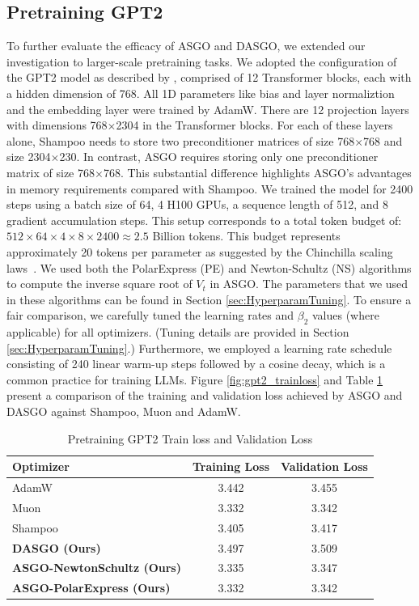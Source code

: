 \documentclass{article}
\theoremstyle{remark}
\begin{document}
\subsection{Pretraining GPT2}\label{sec:pretrainGPT2}
To further evaluate the efficacy of ASGO and DASGO, we extended our investigation to larger-scale pretraining tasks.
We adopted the configuration of the GPT2 model as described by \citep{Karpathy2022},
comprised of 12 Transformer blocks, each with a hidden dimension of 768. All 1D parameters like bias and layer normaliztion and  the embedding layer were trained by AdamW.
There are 12 projection layers with dimensions 768$\times$2304 in the Transformer blocks.
For each of these layers alone, Shampoo needs to store two preconditioner matrices of size 768$\times$768 and size 2304$\times$230.
In contrast, ASGO requires storing only one preconditioner matrix of size 768$\times$768.
This substantial difference highlights ASGO's advantages in memory requirements compared with Shampoo.
We trained the model for 2400 steps using a batch size of 64, 4 H100 GPUs, a sequence length of 512, and 8 gradient accumulation steps.
This setup corresponds to a total token budget of: $512 \times 64 \times 4 \times 8 \times 2400 \approx 2.5$ Billion tokens. 
This budget represents approximately 20 tokens per parameter as suggested by the Chinchilla scaling laws~\citep{hoffmann2022training}. We used both the PolarExpress (PE) and Newton-Schultz (NS) algorithms to compute the inverse square root of $V_t$ in  ASGO.  The parameters that we used in these algorithms can be found in Section \ref{sec:HyperparamTuning}.
To ensure a fair comparison, we carefully tuned the learning rates and $\beta_2$ values (where applicable) for all optimizers. (Tuning details are provided in Section \ref{sec:HyperparamTuning}.)
Furthermore, we employed a learning rate schedule consisting of 240 linear warm-up steps followed by a cosine decay, which is a common practice for training LLMs.
Figure \ref{fig:gpt2_trainloss} and Table \ref{table:pretrain_GPT2_loss} present a comparison of the training and validation loss achieved by ASGO and DASGO against Shampoo, Muon and AdamW.
\begin{table}[h!]
    \caption{Pretraining GPT2 Train loss and Validation Loss}
    \label{table:pretrain_GPT2_loss}
    \centering
    \begin{tabular}{lcc}
    \toprule
    \textbf{Optimizer} & \textbf{Training Loss} & \textbf{Validation Loss} \\
    \midrule
    AdamW & 3.442 & 3.455 \\
    Muon  & 3.332 & 3.342 \\
    Shampoo & 3.405 & 3.417 \\
    \textbf{DASGO (Ours)} & 3.497 & 3.509 \\
    \textbf{ASGO-NewtonSchultz (Ours)} & 3.335 & 3.347 \\
    \textbf{ASGO-PolarExpress (Ours)} & 3.332 & 3.342 \\
    \bottomrule
    \end{tabular}
    
    
    \vspace{-0.1in}
\end{table}	
\end{document}
